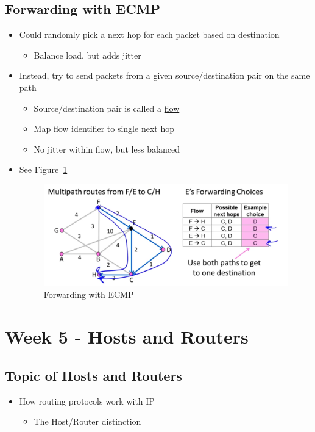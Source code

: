 \documentclass[12pt]{ctexart}   %
\begin{document}
	\subsection{Forwarding with ECMP}
	\begin{itemize}
		\item Could randomly pick a next hop for each packet based on destination
		\begin{itemize}
			\item Balance load, but adds jitter
		\end{itemize}
		
		\item Instead, try to send packets from a given source/destination pair on the same path
		\begin{itemize}
			\item Source/destination pair is called a \underline{flow}
			\item Map flow identifier to single next hop
			\item No jitter within flow, but less balanced
		\end{itemize}
		\item See Figure~\ref{fig:5-7-6}
			
		\begin{figure}[h!] %
		\centering
		 \includegraphics[scale=0.7]{images/5-7-6}
		\caption{ Forwarding with ECMP }
		 \label{fig:5-7-6}
		 \end{figure}
	\end{itemize}

\section{Week 5 - Hosts and Routers}
	\subsection{Topic of Hosts and Routers}
	\begin{itemize}
		\item How routing protocols work with IP
		\begin{itemize}
			\item The Host/Router distinction
		\end{itemize}
	\end{itemize}
	
\end{document}
